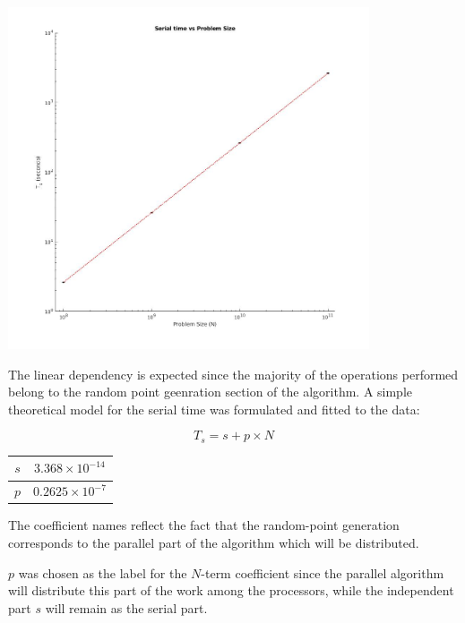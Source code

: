 \documentclass{article}
\begin{document}
\begin{minipage}{\linewidth}
\begin{minipage}{0.6\linewidth}
\label{serial_scaling}
\includegraphics[width=0.8\textwidth]{Serial_times}
\end{minipage}
\begin{minipage}{0.4\linewidth}
The linear dependency is expected since the majority of the operations performed belong to the random point geenration section of the algorithm. A simple theoretical model for the serial time was formulated and fitted to the data:

\begin{center}

\begin{equation}
T_s = s + p\times N	
\end{equation}


 \begin{tabular}{|c | c | } 
 \hline
 $s$ & $ 3.368\times 10^{-14}  $  \\ 
 \hline
 $p$ & $ 0.2625\times 10^{-7} $ \\
 \hline
\end{tabular}
\label{serial_coefs}

\end{center}



The coefficient names reflect the fact that the random-point generation corresponds to the parallel part of the algorithm which will be distributed.

$p$ was chosen as the label for the $N$-term coefficient since the parallel algorithm will distribute this part of the work among the processors, while the independent part $s$ will remain as the serial part.
\end{minipage}

\end{minipage}
\end{document}
